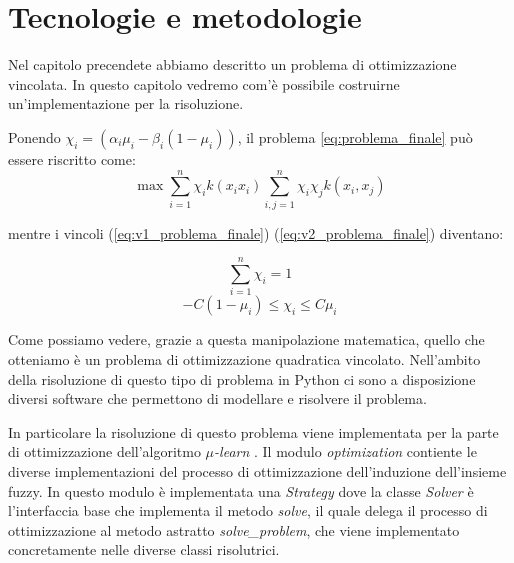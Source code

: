 \documentclass[a4paper,12pt]{report}
\begin{document}



%
%

\chapter{Tecnologie e metodologie}
\label{Capitolo 2}
Nel capitolo precendete abbiamo descritto un problema di ottimizzazione vincolata. In questo capitolo vedremo com'è possibile costruirne un'implementazione per la risoluzione.

\bigskip

\noindent Ponendo $\chi_i = (\alpha_i\mu_i - \beta_i(1-\mu_i))$, il problema \ref{eq:problema_finale} può essere riscritto come:
\begin{equation}
    \max \displaystyle\sum_{i=1}^{n}\chi_ik(x_ix_i)\displaystyle\sum_{i,j=1}^{n}\chi_i\chi_j k(x_i,x_j)
\label{eq:problema_finale_2}
\end{equation}

\noindent mentre i vincoli (\ref{eq:v1_problema_finale}) (\ref{eq:v2_problema_finale}) diventano:

\begin{equation}
    \displaystyle\sum_{i=1}^{n}\chi_i = 1
    \label{eq:v1_problema_finale_2}
\end{equation}
\begin{equation}
    -C(1-\mu_i) \le \chi_i \le C\mu_i
    \label{eq:v2_problema_finale_2}
\end{equation}

\noindent Come possiamo vedere, grazie a questa manipolazione matematica, quello che otteniamo è un problema di ottimizzazione quadratica vincolato.
Nell'ambito della risoluzione di questo tipo di problema in Python ci sono a disposizione diversi software che permettono di modellare e risolvere il problema.

In particolare la risoluzione di questo problema viene implementata per la parte di ottimizzazione dell'algoritmo \textit{$\mu$-learn} \cite{mulearn_documentation}. Il modulo \textit{optimization} contiente le diverse implementazioni del processo di ottimizzazione dell'induzione dell'insieme fuzzy. In questo modulo è implementata una \textit{Strategy} \cite{strategy_pattern} dove la classe \textit{Solver} è l'interfaccia base che implementa il metodo \textit{solve}, il quale delega il processo di ottimizzazione al metodo astratto \textit{solve\_problem}, che viene implementato concretamente nelle diverse classi risolutrici.
\end{document}
